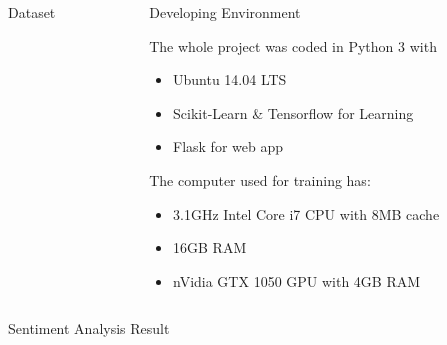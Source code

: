 \documentclass[final]{beamer}
\newlength{\onecolwid}
\newlength{\twocolwid}
\begin{document}
\begin{frame}[t]
\begin{columns}[t]
\begin{column}{\twocolwid}
\begin{columns}[t,totalwidth=\twocolwid]
\begin{column}{\onecolwid}
\begin{block}{Dataset}
\end{block}


\end{column} %

\begin{column}{\onecolwid}\vspace{-.6in} %


\begin{block}{Developing Environment}

The whole project was coded in Python 3 with
\begin{itemize}
    \item Ubuntu 14.04 LTS
    \item Scikit-Learn \& Tensorflow for Learning
    \item Flask for web app
\end{itemize}

The computer used for training has:
\begin{itemize}
    \item 3.1GHz Intel Core i7 CPU with 8MB cache
    \item 16GB RAM
    \item nVidia GTX 1050 GPU with 4GB RAM
\end{itemize}


\end{block}


\end{column} %

\end{columns} %


\begin{alertblock}{Sentiment Analysis Result}


\end{alertblock}
\end{column}
\end{columns}
\end{frame}
\end{document}
